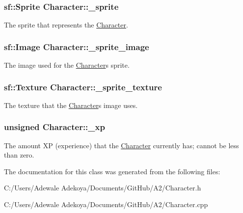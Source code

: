\subsubsection[{\+\_\+sprite}]{\setlength{\rightskip}{0pt plus 5cm}sf\+::\+Sprite Character\+::\+\_\+sprite\hspace{0.3cm}{\ttfamily [protected]}}\label{class_character_ab3b89d967b817bc3e199ed70f6b6277a}
The sprite that represents the \hyperlink{class_character}{Character}. \hypertarget{class_character_a1a8bdd55f5f5ec76eabc83c28f0207e4}{}
\subsubsection[{\+\_\+sprite\+\_\+image}]{\setlength{\rightskip}{0pt plus 5cm}sf\+::\+Image Character\+::\+\_\+sprite\+\_\+image\hspace{0.3cm}{\ttfamily [protected]}}\label{class_character_a1a8bdd55f5f5ec76eabc83c28f0207e4}
The image used for the \hyperlink{class_character}{Character}\textquotesingle{}s sprite. \hypertarget{class_character_aced7e12300ddeaee16c95850e028b10f}{}
\subsubsection[{\+\_\+sprite\+\_\+texture}]{\setlength{\rightskip}{0pt plus 5cm}sf\+::\+Texture Character\+::\+\_\+sprite\+\_\+texture\hspace{0.3cm}{\ttfamily [protected]}}\label{class_character_aced7e12300ddeaee16c95850e028b10f}
The texture that the \hyperlink{class_character}{Character}\textquotesingle{}s image uses. \hypertarget{class_character_a1155ad0a6f019df868ce25fb18767c3d}{}
\subsubsection[{\+\_\+xp}]{\setlength{\rightskip}{0pt plus 5cm}unsigned Character\+::\+\_\+xp\hspace{0.3cm}{\ttfamily [protected]}}\label{class_character_a1155ad0a6f019df868ce25fb18767c3d}
The amount X\+P (experience) that the \hyperlink{class_character}{Character} currently has; cannot be less than zero. 

The documentation for this class was generated from the following files\+:\begin{DoxyCompactItemize}
\item 
C\+:/\+Users/\+Adewale Adekoya/\+Documents/\+Git\+Hub/\+A2/Character.\+h\item 
C\+:/\+Users/\+Adewale Adekoya/\+Documents/\+Git\+Hub/\+A2/Character.\+cpp\end{DoxyCompactItemize}
